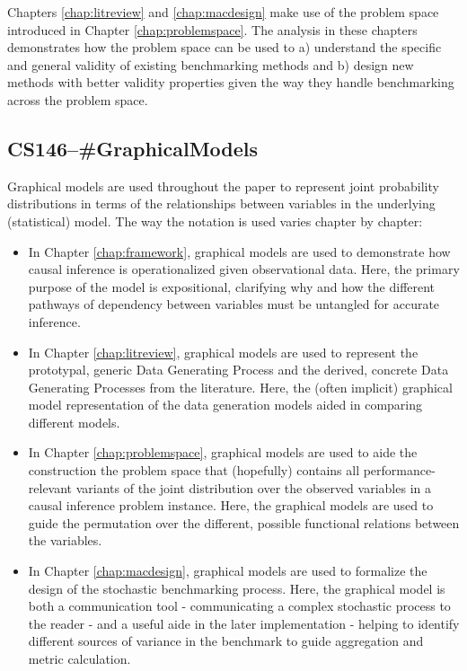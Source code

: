 \documentclass[../main.tex]{subfiles}
\begin{document}
\vspace{\baselineskip}

Chapters \ref{chap:litreview} and \ref{chap:macdesign} make use of the problem space introduced in Chapter \ref{chap:problemspace}. The analysis in these chapters demonstrates how the problem space can be used to a) understand the specific and general validity of existing benchmarking methods and b) design new methods with better validity properties given the way they handle benchmarking across the problem space.


\subsection*{\textbf{CS146--\#GraphicalModels}}
\label{lo:GraphicalModels}

Graphical models are used throughout the paper to represent joint probability distributions in terms of the relationships between variables in the underlying (statistical) model. The way the notation is used varies chapter by chapter:

\begin{itemize}
    \item In Chapter \ref{chap:framework}, graphical models are used to demonstrate how causal inference is operationalized given observational data. Here, the primary purpose of the model is expositional, clarifying why and how the different pathways of dependency between variables must be untangled for accurate inference.
    
    \item In Chapter \ref{chap:litreview}, graphical models are used to represent the prototypal, generic Data Generating Process and the derived, concrete Data Generating Processes from the literature. Here, the (often implicit) graphical model representation of the data generation models aided in comparing different models.
    
    \item In Chapter \ref{chap:problemspace}, graphical models are used to aide the construction the problem space that (hopefully) contains all performance-relevant variants of the joint distribution over the observed variables in a causal inference problem instance. Here, the graphical models are used to guide the permutation over the different, possible functional relations between the variables.
    
    \item In Chapter \ref{chap:macdesign}, graphical models are used to formalize the design of the stochastic benchmarking process. Here, the graphical model is both a communication tool - communicating a complex stochastic process to the reader - and a useful aide in the later implementation - helping to identify different sources of variance in the benchmark to guide aggregation and metric calculation.
\end{itemize}
\end{document}
